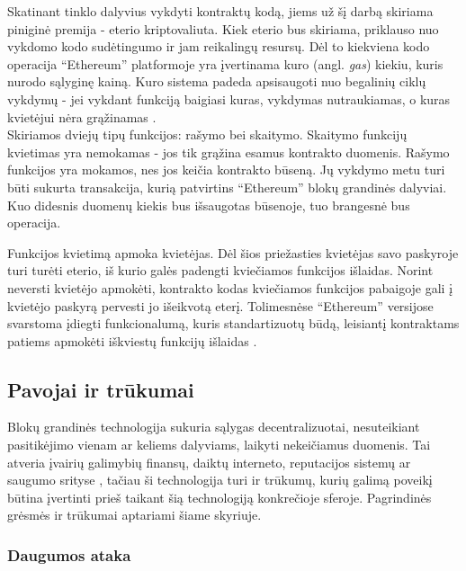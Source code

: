 Skatinant tinklo dalyvius vykdyti kontraktų kodą, jiems už šį darbą skiriama piniginė premija - eterio kriptovaliuta. Kiek eterio
bus skiriama, priklauso nuo vykdomo kodo sudėtingumo ir jam reikalingų resursų. Dėl to kiekviena kodo operacija \enquote{Ethereum} platformoje
yra įvertinama kuro (angl. \textit{gas}) kiekiu, kuris nurodo sąlyginę kainą. Kuro sistema padeda apsisaugoti nuo begalinių ciklų vykdymų - jei vykdant
funkciją baigiasi kuras, vykdymas nutraukiamas, o kuras kvietėjui nėra grąžinamas \cite{EthereumWhitePaper}.\\
Skiriamos dviejų tipų funkcijos: rašymo bei skaitymo. Skaitymo funkcijų kvietimas yra nemokamas - jos tik grąžina
esamus kontrakto duomenis. Rašymo funkcijos yra mokamos, nes jos keičia kontrakto būseną. Jų vykdymo metu turi būti sukurta transakcija,
kurią patvirtins \enquote{Ethereum} blokų grandinės dalyviai. Kuo didesnis duomenų kiekis bus išsaugotas būsenoje, tuo brangesnė bus operacija.

Funkcijos kvietimą apmoka kvietėjas. Dėl šios priežasties kvietėjas savo paskyroje turi turėti eterio, iš kurio galės padengti
kviečiamos funkcijos išlaidas. Norint neversti kvietėjo apmokėti, kontrakto kodas kviečiamos funkcijos pabaigoje gali į kvietėjo paskyrą
pervesti jo išeikvotą eterį. Tolimesnėse \enquote{Ethereum} versijose svarstoma įdiegti funkcionalumą,
kuris standartizuotų būdą, leisiantį kontraktams patiems apmokėti iškviestų funkcijų išlaidas \cite{ContractPays}.

\subsection{Pavojai ir trūkumai} \label{blockchain:concerns}

Blokų grandinės technologija sukuria sąlygas decentralizuotai, nesuteikiant pasitikėjimo vienam ar keliems dalyviams, laikyti nekeičiamus duomenis.
Tai atveria įvairių galimybių finansų, daiktų interneto, reputacijos sistemų ar saugumo srityse \cite{Zheng2017}, tačiau ši technologija turi ir trūkumų,
kurių galimą poveikį būtina įvertinti prieš taikant šią technologiją konkrečioje sferoje. Pagrindinės grėsmės ir trūkumai aptariami šiame skyriuje.

\subsubsection{Daugumos ataka}

